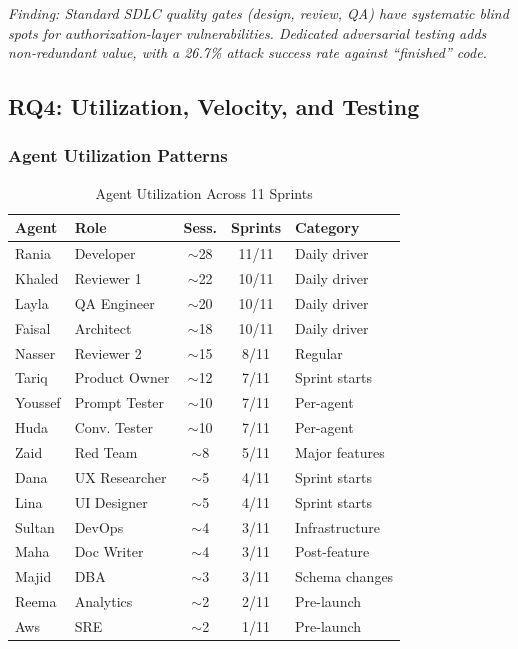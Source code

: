 \documentclass[11pt,a4paper]{article}
\begin{document}
\textit{Finding: Standard SDLC quality gates (design, review, QA) have systematic blind spots for authorization-layer vulnerabilities. Dedicated adversarial testing adds non-redundant value, with a 26.7\% attack success rate against ``finished'' code.}

\subsection{RQ4: Utilization, Velocity, and Testing}
\label{sec:rq4}

\subsubsection{Agent Utilization Patterns}

\begin{table}[htbp]
\caption{Agent Utilization Across 11 Sprints}
\label{tab:utilization}
\centering
\footnotesize
\begin{tabular}{@{}llccl@{}}
\toprule
\textbf{Agent} & \textbf{Role} & \textbf{Sess.} & \textbf{Sprints} & \textbf{Category} \\
\midrule
Rania & Developer & $\sim$28 & 11/11 & Daily driver \\
Khaled & Reviewer 1 & $\sim$22 & 10/11 & Daily driver \\
Layla & QA Engineer & $\sim$20 & 10/11 & Daily driver \\
Faisal & Architect & $\sim$18 & 10/11 & Daily driver \\
Nasser & Reviewer 2 & $\sim$15 & 8/11 & Regular \\
Tariq & Product Owner & $\sim$12 & 7/11 & Sprint starts \\
Youssef & Prompt Tester & $\sim$10 & 7/11 & Per-agent \\
Huda & Conv. Tester & $\sim$10 & 7/11 & Per-agent \\
Zaid & Red Team & $\sim$8 & 5/11 & Major features \\
Dana & UX Researcher & $\sim$5 & 4/11 & Sprint starts \\
Lina & UI Designer & $\sim$5 & 4/11 & Sprint starts \\
Sultan & DevOps & $\sim$4 & 3/11 & Infrastructure \\
Maha & Doc Writer & $\sim$4 & 3/11 & Post-feature \\
Majid & DBA & $\sim$3 & 3/11 & Schema changes \\
Reema & Analytics & $\sim$2 & 2/11 & Pre-launch \\
Aws & SRE & $\sim$2 & 1/11 & Pre-launch \\
\bottomrule
\end{tabular}
\end{table}
\end{document}
